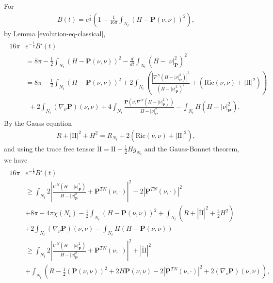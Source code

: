 \documentclass[11pt,letterpaper]{amsart}
\theoremstyle{definition}
\theoremstyle{remark}
\newcommand{\Pten}{\mathbf P}
\begin{document}
For
\begin{align*}
	B(t) = e ^{\frac{t}{2}} \left( 1- \frac{1}{16 \pi } \int_{N_t} (H - \Pten(\nu ,\nu ))^2 \right) ,
\end{align*}
by Lemma \ref{evolution-eq-classical}, 
\begin{align*}
	\begin{split}
	16 \pi & e ^{-\frac{t}{2}}B'(t)\\
		&= 8 \pi  - \frac{1}{2} \int_{N_t}(H- \Pten(\nu ,\nu ) )^2 -\frac{d}{d t} \int_{N_t} (H- |\nu |^2_{\Pten })^2 \\
									&= 8 \pi  - \frac{1}{2} \int_{N_t}(H- \Pten(\nu ,\nu ) )^2 + 2 \int_{N_t} \left(   \frac{|\nabla ^{N} (H-|\nu |^2_{\Pten })|^2}{(H-|\nu |^2_{\Pten })^2} + \left( \mathrm{Ric}(\nu ,\nu ) +|\mathrm{II}|^2 \right) \right) \\
									&\ \ +2 \int_{N_t}  (\nabla _{\nu } \Pten ) (\nu , \nu ) + 4 \int_{N_t} \frac{\Pten ( \nu , \nabla ^{N}(H- |\nu |^2_{\Pten }) )}{H- |\nu |^2_{\Pten }} - \int_{N_t}H(H-|\nu |^2_{\Pten }).
	\end{split}
\end{align*}  
By the Gauss equation
	\begin{align*}
		R + |\mathrm{II}|^2 + H^2 = R_{N_t} + 2 \left( \mathrm{Ric}(\nu , \nu ) + |\mathrm{II}|^2 \right) ,
	\end{align*} 
	and using the trace free tensor $\mathring{\mathrm{II}} = \mathrm{II} - \frac{1}{2} H g_{N_t}$ and the Gauss-Bonnet theorem,
	we have
	\begin{align*}
		\begin{split}
			16 \pi & e ^{-\frac{t}{2}}B'(t) \\
			       &\geq  \int_{N_t} 2\left| \frac{\nabla ^{N} (H-|\nu |^2_{\Pten })}{H-|\nu |^2_{\Pten }} + \Pten ^{TN}(\nu , \cdot ) \right| ^2  - 2|\Pten ^{TN}(\nu ,\cdot )|^2  \\
			       & + 8 \pi - 4 \pi \chi (N_t) - \frac{1}{2} \int_{N_t} (H- \Pten(\nu ,\nu ) )^2 + \int_{N_t} \left( R + |\mathring{\mathrm{II}}|^2 + \frac{3}{2}H^2 \right) \\
			       &+2 \int_{N_t}  (\nabla _{\nu } \Pten ) (\nu , \nu ) - \int_{N_t}H(H-\Pten (\nu ,\nu ))\\
			       &\geq  \int_{N_t} 2\left| \frac{\nabla ^{N} (H-|\nu |^2_{\Pten })}{H-|\nu |^2_{\Pten }} + \Pten ^{TN}(\nu , \cdot ) \right| ^2 + |\mathring{\mathrm{II}}|^2 \\
			       & + \int_{N_t} \left( R - \frac{1}{2} (\Pten(\nu ,\nu  ) )^2 + 2 H \Pten(\nu ,\nu ) - 2 |\Pten ^{TN}(\nu ,\cdot )|^2 + 2 (\nabla _{\nu }\Pten)(\nu ,\nu ) \right) ,
		\end{split}
	\end{align*} 
\end{document}
